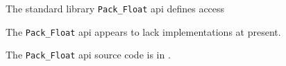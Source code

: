 
The standard library {\tt Pack\_Float} api defines access 

The {\tt Pack\_Float} api appears to lack implementations at present.

The {\tt Pack\_Float} api source code is in .

